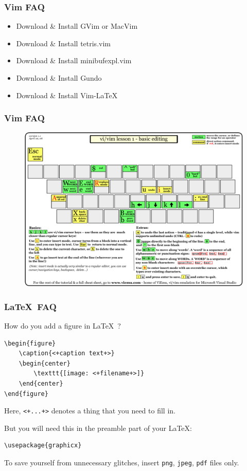 \documentclass[hyperref={colorlinks=false},handout,10pt]{beamer}
\let\olditem\item
\renewcommand{\item}{\setlength{\itemsep}{0.5\baselineskip}\olditem}
\def\LaTeXs{\LaTeX\ }
\begin{document}
\begin{frame}
    \frametitle{Vim FAQ}
    \begin{itemize}
        \item Download \& Install GVim or MacVim
        \item Download \& Install tetris.vim
        \item Download \& Install minibufexpl.vim
        \item Download \& Install Gundo 
        \item Download \& Install Vim-LaTeX
    \end{itemize}
\end{frame}

\begin{frame}
    \frametitle{Vim FAQ}
    \begin{figure}
        \begin{center}
            \includegraphics[width=\textwidth]{images/vi-vim-tutorial-1.png}
        \end{center}
    \end{figure}
\end{frame}

\begin{frame}[fragile]
    \frametitle{\LaTeXs FAQ}
    \begin{block}{How do you add a figure in \LaTeXs?}
    \begin{lstlisting}
\begin{figure}
    \caption{<+caption text+>}
    \begin{center}
        \texttt{[image: <+filename+>]}
    \end{center}
\end{figure}
    \end{lstlisting}
     Here, \verb$<+...+>$ denotes a thing that you need to fill in.
    \end{block}
    \begin{block}{But you will need this in the preamble part of your \LaTeX:}
    \begin{lstlisting}
\usepackage{graphicx} 
    \end{lstlisting}
    To save yourself from unnecessary glitches, insert \texttt{png},
    \texttt{jpeg}, \texttt{pdf} files only.
    \end{block}
\end{frame}
\end{document}
